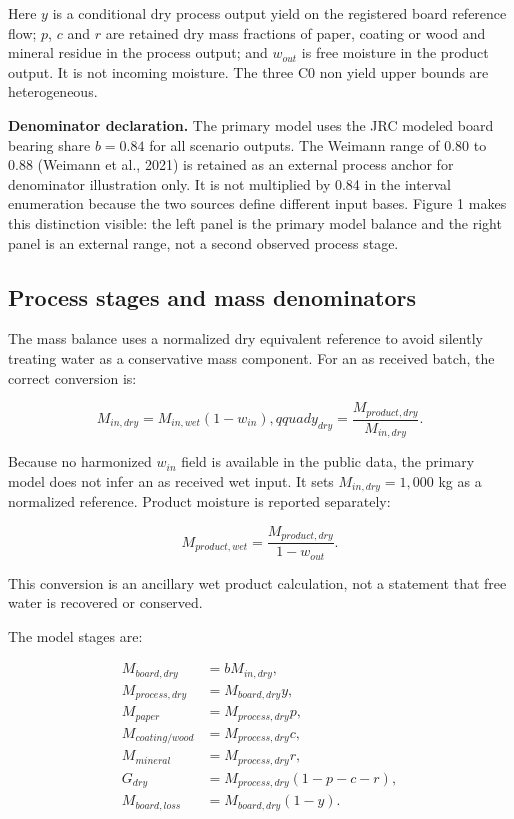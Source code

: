 \documentclass[pdflatex,sn-basic]{sn-jnl}
\begin{document}
Here \(y\) is a conditional dry process output yield on the registered board reference flow; \(p\), \(c\) and \(r\) are retained dry mass fractions of paper, coating or wood and mineral residue in the process output; and \(w_{out}\) is free moisture in the product output. It is not incoming moisture. The three C0 non yield upper bounds are heterogeneous.

\textbf{Denominator declaration.} The primary model uses the JRC modeled board bearing share \(b=0.84\) for all scenario outputs. The Weimann range of 0.80 to 0.88 (Weimann et al., 2021) is retained as an external process anchor for denominator illustration only. It is not multiplied by 0.84 in the interval enumeration because the two sources define different input bases. Figure 1 makes this distinction visible: the left panel is the primary model balance and the right panel is an external range, not a second observed process stage.

\subsection{Process stages and mass denominators}\label{process-stages-and-mass-denominators}

The mass balance uses a normalized dry equivalent reference to avoid silently treating water as a conservative mass component. For an as received batch, the correct conversion is:

\[
M_{in,dry}=M_{in,wet}(1-w_{in}),qquad
y_{dry}=\frac{M_{product,dry}}{M_{in,dry}}.
\]

Because no harmonized \(w_{in}\) field is available in the public data, the primary model does not infer an as received wet input. It sets \(M_{in,dry}=1{,}000\) kg as a normalized reference. Product moisture is reported separately:

\[
M_{product,wet}=\frac{M_{product,dry}}{1-w_{out}}.
\]

This conversion is an ancillary wet product calculation, not a statement that free water is recovered or conserved.

The model stages are:

\[
\begin{aligned}
M_{board,dry} &= bM_{in,dry},\\
M_{process,dry} &= M_{board,dry}y,\\
M_{paper} &= M_{process,dry}p,\\
M_{coating/wood} &= M_{process,dry}c,\\
M_{mineral} &= M_{process,dry}r,\\
G_{dry} &= M_{process,dry}(1-p-c-r),\\
M_{board,loss} &= M_{board,dry}(1-y).
\end{aligned}
\]
\end{document}
